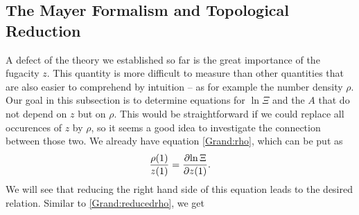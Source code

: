 \documentclass[8.5pt,twoside,twocolumn]{article}
\theoremstyle{standard}
\begin{document}
\subsection{The Mayer Formalism and Topological Reduction}
\label{TopRed}
A defect of the theory we established so far is the great importance of the fugacity $z$. This quantity
is more difficult to measure than other quantities that are also easier to comprehend by intuition --
as for example the number density $\rho$.
Our goal in this subsection is to determine equations for
$\ln \Xi$ and the  $A$ that do not depend on $z$ but on $\rho$. This
would be straightforward if we could replace all occurences of $z$ by $\rho$, so it seems
a good idea to investigate the connection between those two. We already have equation
\eqref{Grand:rho}, which can be put as
\begin{equation}
\frac {\rho(1)} {z(1)} = \frac {\partial{\ln\Xi}} {\partial{z(1)}}.
\end{equation} 
We will see that reducing the right hand side of this equation leads to the desired
relation. Similar to \eqref{Grand:reducedrho}, we get
\end{document}
